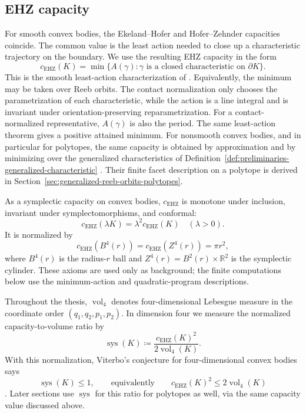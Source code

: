 \subsection{EHZ capacity}\label{subsec:preliminaries-smooth-symplectic-geometry}

For smooth convex bodies, the Ekeland--Hofer and Hofer--Zehnder capacities
coincide. The common value is the least action needed to close up a
characteristic trajectory on the boundary. We use the resulting EHZ capacity in
the form
\begin{equation}\label{eq:preliminaries-ehz-capacity}
  c_{\mathrm{EHZ}}(K)
  = \min\{A(\gamma):\gamma
    \text{ is a closed characteristic on }\partial K\}.
\end{equation}
This is the smooth least-action characterization of
\cite[Theorem~2.2]{AAO2014}.
Equivalently, the minimum may be taken over Reeb orbits. The contact
normalization only chooses the parametrization of each characteristic, while
the action is a line integral and is invariant under orientation-preserving
reparametrization. For a contact-normalized representative, \(A(\gamma)\) is
also the period. The same least-action theorem gives a positive attained
minimum. For nonsmooth
convex bodies, and in particular for polytopes, the same capacity is obtained
by approximation and by minimizing over the generalized characteristics of
Definition~\ref{def:preliminaries-generalized-characteristic}
\cite[Proposition~2.7]{AAO2014}. Their finite
facet description on a polytope is derived in
Section~\ref{sec:generalized-reeb-orbits-polytopes}.

As a symplectic capacity on convex bodies, \(c_{\mathrm{EHZ}}\) is monotone
under inclusion, invariant under symplectomorphisms, and conformal:
\[
  c_{\mathrm{EHZ}}(\lambda K)=\lambda^2c_{\mathrm{EHZ}}(K)
  \quad(\lambda>0).
\]
It is normalized by
\[
  c_{\mathrm{EHZ}}(B^4(r))=c_{\mathrm{EHZ}}(Z^4(r))=\pi r^2,
\]
where \(B^4(r)\) is the radius-\(r\) ball and
\(Z^4(r)=B^2(r)\times\mathbb{R}^2\) is the symplectic cylinder. These axioms
are used only as background; the finite computations below use the
minimum-action and quadratic-program descriptions.

Throughout the thesis, \(\operatorname{vol}_4\) denotes four-dimensional
Lebesgue measure in the coordinate order \((q_1,q_2,p_1,p_2)\). In dimension
four we measure the normalized capacity-to-volume ratio by
\begin{equation}\label{eq:preliminaries-systolic-ratio}
  \operatorname{sys}(K)
  \coloneqq
  \frac{c_{\mathrm{EHZ}}(K)^2}{2\operatorname{vol}_4(K)}.
\end{equation}
With this normalization, Viterbo's conjecture for four-dimensional convex
bodies says
\[
  \operatorname{sys}(K)\leq 1,
  \qquad\text{equivalently}\qquad
  c_{\mathrm{EHZ}}(K)^2\leq 2\operatorname{vol}_4(K)
\]
\cite{Viterbo2000}. Later sections use
\(\operatorname{sys}\) for this ratio for polytopes as well, via the same
capacity value discussed above.


